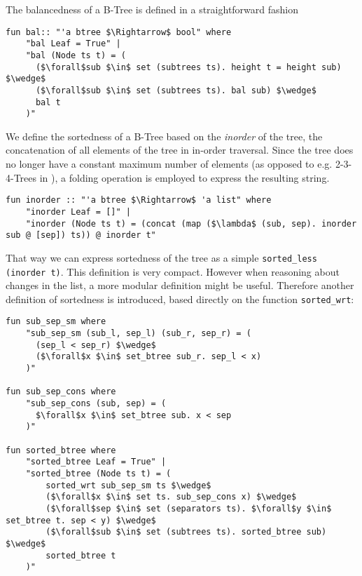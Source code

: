 The balancedness of a B-Tree is defined in a straightforward fashion
\begin{lstlisting}[mathescape=true, language=Isabelle]
fun bal:: "'a btree $\Rightarrow$ bool" where
    "bal Leaf = True" |
    "bal (Node ts t) = (
      ($\forall$sub $\in$ set (subtrees ts). height t = height sub) $\wedge$
      ($\forall$sub $\in$ set (subtrees ts). bal sub) $\wedge$
      bal t
    )"
\end{lstlisting}

We define the sortedness of a B-Tree based on the \textit{inorder} of the tree,
the concatenation of all elements of the tree in in-order traversal.
Since the tree does no longer have a constant maximum number of elements (as opposed to
e.g. 2-3-4-Trees in \parencite{DBLP:conf/itp/Nipkow16}),
a folding operation is employed to express the resulting string. 

\begin{lstlisting}[mathescape=true, language=Isabelle]
fun inorder :: "'a btree $\Rightarrow$ 'a list" where
    "inorder Leaf = []" |
    "inorder (Node ts t) = (concat (map ($\lambda$ (sub, sep). inorder sub @ [sep]) ts)) @ inorder t"
\end{lstlisting}

That way we can express sortedness of the tree as a simple \texttt{sorted\_less (inorder t)}.
This definition is very compact.
However when reasoning about changes in the list,
a more modular definition might be useful.
Therefore another definition of sortedness is introduced, based directly
on the function \texttt{sorted\_wrt}:

\begin{lstlisting}[mathescape=true, language=Isabelle]
fun sub_sep_sm where
    "sub_sep_sm (sub_l, sep_l) (sub_r, sep_r) = (
      (sep_l < sep_r) $\wedge$
      ($\forall$x $\in$ set_btree sub_r. sep_l < x)
    )"
  
fun sub_sep_cons where
    "sub_sep_cons (sub, sep) = (
      $\forall$x $\in$ set_btree sub. x < sep
    )"

fun sorted_btree where
    "sorted_btree Leaf = True" |
    "sorted_btree (Node ts t) = (
        sorted_wrt sub_sep_sm ts $\wedge$
        ($\forall$x $\in$ set ts. sub_sep_cons x) $\wedge$
        ($\forall$sep $\in$ set (separators ts). $\forall$y $\in$ set_btree t. sep < y) $\wedge$
        ($\forall$sub $\in$ set (subtrees ts). sorted_btree sub) $\wedge$
        sorted_btree t
    )"
\end{lstlisting}

